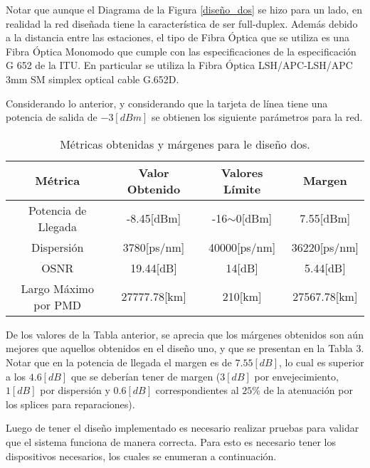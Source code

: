 \documentclass[letterpaper,11pt]{article} %
\begin{document}

\newp
Notar que aunque el Diagrama de la Figura \ref{diseño_dos} se hizo para un lado, en realidad la red diseñada tiene la característica de ser full-duplex. Además debido a la distancia entre las estaciones, el tipo de Fibra Óptica que se utiliza es una Fibra Óptica Monomodo que cumple con las especificaciones de la especificación G 652 de la ITU. En particular se utiliza la Fibra Óptica LSH/APC-LSH/APC 3mm SM simplex optical cable G.652D.

\newp
Considerando lo anterior, y considerando que la tarjeta de línea tiene una potencia de salida de $-3[dBm]$ se obtienen los siguiente parámetros para la red.

\begin{table}[H]
\begin{tabular}{|c|c|c|c|}
\hline
\textbf{Métrica}     & \textbf{Valor Obtenido} & \textbf{Valores Límite} & \textbf{Margen}  \\ \hline
Potencia de Llegada  & -8.45{[}dBm{]}           & -16$\sim$0{[}dBm{]}     & 7.55{[}dBm{]}     \\ \hline
Dispersión           & 3780{[}ps/nm{]}          & 40000{[}ps/nm{]}          & 36220{[}ps/nm{]}   \\ \hline
OSNR                 & 19.44{[}dB{]}           & 14{[}dB{]}              & 5.44{[}dB{]}    \\ \hline
Largo Máximo por PMD & 27777.78{[}km{]}        & 210{[}km{]}             & 27567.78{[}km{]} \\ \hline
\end{tabular}
\caption{Métricas obtenidas y márgenes para le diseño dos.}
\end{table}

\newp
De los valores de la Tabla anterior, se aprecia que los márgenes obtenidos son aún mejores que aquellos obtenidos en el diseño uno, y que se presentan en la Tabla 3. Notar que en la potencia de llegada el margen es de $7.55[dB]$, lo cual es superior a los $4.6[dB]$ que se deberían tener de margen ($3[dB]$ por envejecimiento, $1[dB]$ por dispersión y $0.6[dB]$ correspondientes al $25\%$ de la atenuación por los splices para reparaciones).

\newp
Luego de tener el diseño implementado es necesario realizar pruebas para validar que el sistema funciona de manera correcta. Para esto es necesario tener los dispositivos necesarios, los cuales se enumeran a continuación.
\end{document}
